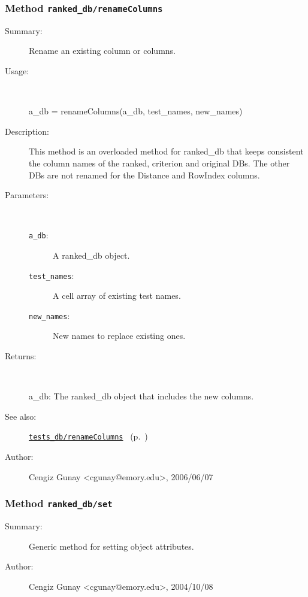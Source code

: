 \subsubsection[Method \texttt{renameColumns}]{Method \texttt{ranked\_db/renameColumns}}%
%
\label{ref_ranked_db__renameColumns}%
\hypertarget{ref_ranked_db__renameColumns}{}%
\begin{description}
\item[Summary:]Rename an existing column or columns.
%
\item[Usage:]~%
\begin{lyxcode}%
a\_db = renameColumns(a\_db, test\_names, new\_names)
%
\end{lyxcode}%
%
\item[Description:]%
This method is an overloaded method for ranked\_db that keeps consistent
 the column names of the ranked, criterion and original DBs. The other
 DBs are not renamed for the Distance and RowIndex columns.
\item[Parameters:]~
\begin{description}%
\item[\texttt{a\_db}:]
 A ranked\_db object.
\item[\texttt{test\_names}:]
 A cell array of existing test names.
\item[\texttt{new\_names}:]
 New names to replace existing ones.
\end{description}%
%
\item[Returns:
]~

	a\_db: The ranked\_db object that includes the new columns.
%
%
\item[See also:]%
\hyperlink{ref_tests_db__renameColumns}{\texttt{tests\_db/renameColumns}}%
\ (p.~\pageref{ref_tests_db__renameColumns})%
%
%
\item[Author:]%
Cengiz Gunay <cgunay@emory.edu>, 2006/06/07
%
\end{description}
\methodline%
\subsubsection[Method \texttt{set}]{Method \texttt{ranked\_db/set}}%
%
\label{ref_ranked_db__set}%
\hypertarget{ref_ranked_db__set}{}%
\begin{description}
\item[Summary:]Generic method for setting object attributes.
%
%
%
%
%
%
%
\item[Author:]%
Cengiz Gunay <cgunay@emory.edu>, 2004/10/08
%
\end{description}
\methodline%
